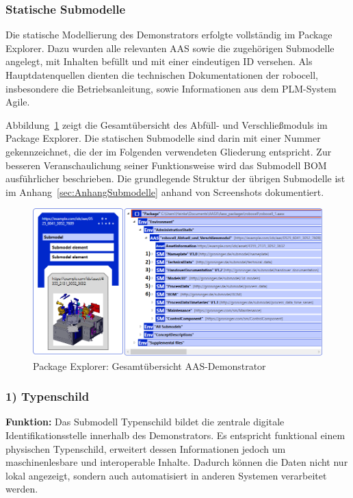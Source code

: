 \newpage
\subsubsection{Statische Submodelle}
Die statische Modellierung des Demonstrators erfolgte vollständig im Package Explorer.
Dazu wurden alle relevanten AAS sowie die zugehörigen Submodelle angelegt, mit Inhalten befüllt und mit einer eindeutigen ID versehen.
Als Hauptdatenquellen dienten die technischen Dokumentationen der robocell, insbesondere die Betriebsanleitung, sowie Informationen aus dem PLM-System Agile.

Abbildung~\ref{fig:PackageExplorerRobocell} zeigt die Gesamtübersicht des Abfüll- und Verschließmoduls im Package Explorer.
Die statischen Submodelle sind darin mit einer Nummer gekennzeichnet, die der im Folgenden verwendeten Gliederung entspricht.
Zur besseren Veranschaulichung seiner Funktionsweise wird das Submodell BOM ausführlicher beschrieben.
Die grundlegende Struktur der übrigen Submodelle ist im Anhang~\ref{sec:AnhangSubmodelle} anhand von Screenshots dokumentiert.

\begin{figure}[htbp]
    \centering
        \includegraphics[width=1\textwidth]{Bilder/ErgebnissePackageExplorer/AASrobocell.PNG}
    \caption{Package Explorer: Gesamtübersicht AAS-Demonstrator}
    \label{fig:PackageExplorerRobocell}
\end{figure}

\subsubsection*{1) Typenschild}
\vspace{-0.5em}
\textbf{Funktion:}  
Das Submodell Typenschild bildet die zentrale digitale Identifikationsstelle innerhalb des Demonstrators. 
Es entspricht funktional einem physischen Typenschild, erweitert dessen Informationen jedoch um maschinenlesbare und interoperable Inhalte. 
Dadurch können die Daten nicht nur lokal angezeigt, sondern auch automatisiert in anderen Systemen verarbeitet werden.


